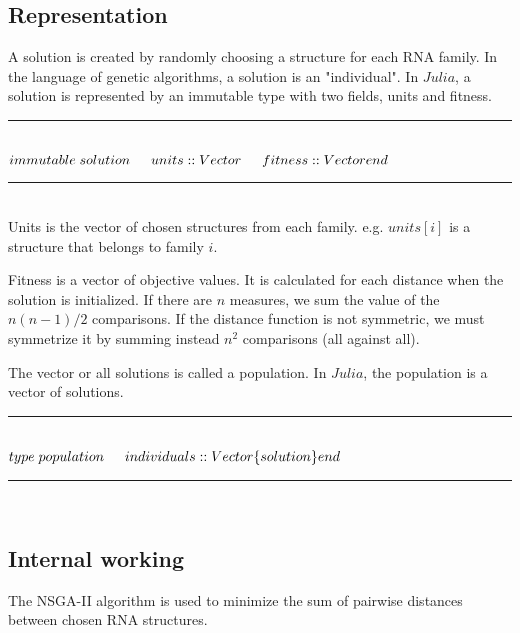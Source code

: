 \documentclass[a4paper, 12pt] {article}
\newcommand{\HRule}{\rule{\linewidth}{0.5mm}}
\begin{document}
\subsection*{Representation}
A solution is created by randomly choosing a structure for each RNA family. In the language of
genetic algorithms, a solution is an "individual".
In $Julia$, a solution is represented by an immutable type with two fields, units and fitness.\\
\HRule \\[0.4cm]
\begin{math}
\noindent
immutable \; solution\\
\indent units::Vector\\
\indent fitness::Vector\\
end\\
\noindent
\end{math}
\HRule \\[0.4cm]
Units is the vector of chosen structures from each family.
e.g. $units[i]$ is a structure that belongs to family $i$.

Fitness is a vector of objective values. It is calculated for each distance when the solution
is initialized. If there are $n$ measures, we sum the value of the $n(n-1)/2$ comparisons. If the distance
function is not symmetric, we must symmetrize it by summing instead $n^2$ comparisons (all against all).


The vector or all solutions is called a population. In $Julia$, the population is a vector of
solutions.\\
\HRule \\[0.4cm]
\begin{math}
type \; population\\
\indent  individuals::Vector\{solution\}\\
end
\end{math}\\
\HRule \\[0.4cm]



\subsection*{Internal working}
\noindent
The NSGA-II algorithm is used to minimize the sum of pairwise distances between chosen RNA structures.
\end{document}

